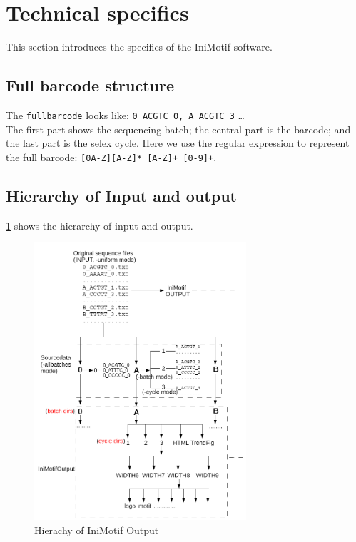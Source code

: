 \documentclass[a4paper,10pt]{article}
\begin{document}
\section{Technical specifics}
\label{sec:techspec}
This section introduces the specifics of the IniMotif software.


\subsection{Full barcode structure}
The \texttt{fullbarcode} looks like: \verb+0_ACGTC_0, A_ACGTC_3+ \ldots \\
The first part shows the sequencing batch; the central part is the barcode; and the last part is the
selex cycle.
Here we use the regular expression to represent the full barcode: \verb|[0A-Z][A-Z]*_[A-Z]+_[0-9]+|.


\subsection{Hierarchy of Input and output}
\figurename{} \ref{fig:outputhierachy} shows the hierarchy of input and output. \\
  \begin{figure}[htp]
   \centering
   \includegraphics[width=0.7\textwidth]{HAHA2.png}
   \caption{Hierachy of IniMotif Output}
   \label{fig:outputhierachy}
  \end{figure}
\end{document}
